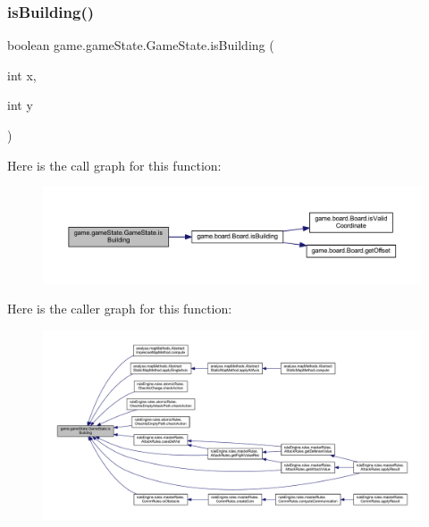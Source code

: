 \subsubsection{\texorpdfstring{is\+Building()}{isBuilding()}}
{\footnotesize\ttfamily boolean game.\+game\+State.\+Game\+State.\+is\+Building (\begin{DoxyParamCaption}\item[{int}]{x,  }\item[{int}]{y }\end{DoxyParamCaption})\hspace{0.3cm}{\ttfamily [inline]}}

Here is the call graph for this function\+:
\nopagebreak
\begin{figure}[H]
\begin{center}
\leavevmode
\includegraphics[width=350pt]{classgame_1_1game_state_1_1_game_state_af6886fabf0eb529d7bda218d46d45ae7_cgraph}
\end{center}
\end{figure}
Here is the caller graph for this function\+:
\nopagebreak
\begin{figure}[H]
\begin{center}
\leavevmode
\includegraphics[width=350pt]{classgame_1_1game_state_1_1_game_state_af6886fabf0eb529d7bda218d46d45ae7_icgraph}
\end{center}
\end{figure}
\mbox{\label{classgame_1_1game_state_1_1_game_state_a8e23f889d162d3d43d9d8d24d3525bbd}} 

